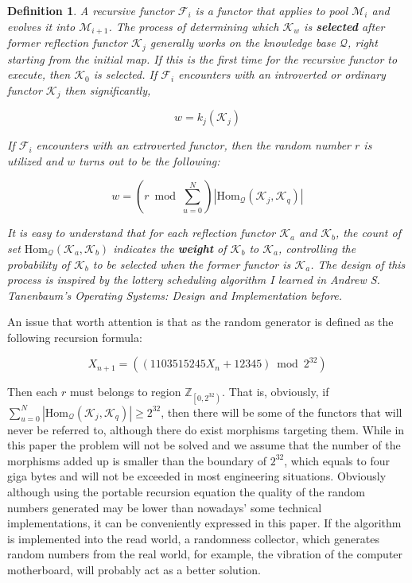 \documentclass{article}
\newtheorem{definition}{Definition}	%
\numberwithin{theorem}{section}	%
\numberwithin{axiom}{section}	%
\numberwithin{definition}{section}	%
\begin{document}
\begin{definition}
	A recursive functor \(\mathcal{F}_i\) is a functor that applies to pool \(\mathcal{M}_i\) and evolves it into \(\mathcal{M}_{i+1}\). The process of determining which \(\mathcal{K}_w\) is \textbf{ selected} after former reflection functor \(\mathcal{K}_j\) generally works on the knowledge base \(\mathcal{Q}\), right starting from the initial map. If this is the first time for the recursive functor to execute, then \(\mathcal{K}_0\) is selected. If \(\mathcal{F}_i\) encounters with an introverted or ordinary functor \(\mathcal{K}_j\) then significantly,
	
	\[w = k_j\left(\mathcal{K}_j\right)\]
	
	If \(\mathcal{F}_i\) encounters with an extroverted functor, then the random number \(\mathit{r}\) is utilized and \(w\) turns out to be the following:
	
	\[w = (\mathit{r} \bmod \sum _{u=0}^N )\left|\text{Hom}_{\mathcal{Q}}\left(\mathcal{K}_j,\mathcal{K}_q\right)\right|\]
	
	It is easy to understand that for each reflection functor \(\mathcal{K}_a\) and \(\mathcal{K}_b\), the count of set \(\text{Hom}_{\mathcal{Q}}\left(\mathcal{K}_a,\mathcal{K}_b\right)\) indicates the \textbf{ weight} of \(\mathcal{K}_b\) to \(\mathcal{K}_a\), controlling the probability of \(\mathcal{K}_b\) to be selected when the former functor is \(\mathcal{K}_a\). The design of this process is inspired by the lottery scheduling algorithm I learned in Andrew S. Tanenbaum{'}s Operating Systems: Design and Implementation \cite{6} before.
\end{definition}

An issue that worth attention is that as the random generator is defined as the following recursion formula: \cite{5}

\[X_{n+1}=(\left(1103515245 X_n+12345\right) \bmod 2^{32})\]

Then each \(\mathit{r}\) must belongs to region \(\mathbb{Z}_{\left.\left[0,2^{32}\right.\right)}\). That is, obviously, if \(\sum _{u=0}^N \left|\text{Hom}_{\mathcal{Q}}\left(\mathcal{K}_j,\mathcal{K}_q\right)\right|\geq 2^{32}\), then there will be some of the functors that will never be referred to, although there do exist morphisms targeting them. While in this paper the problem will not be solved and we assume that the number of the morphisms added up is smaller than the boundary of \(2^{32}\), which equals to four giga bytes and will not be exceeded in most engineering situations. Obviously although using the portable recursion equation the quality of the random numbers generated may be lower than nowadays{'} some technical implementations, it can be conveniently expressed in this paper. If the algorithm is implemented into the read world, a randomness collector, which generates random numbers from the real world, for example, the vibration of the computer motherboard, will probably act as a better solution.
\end{document}
